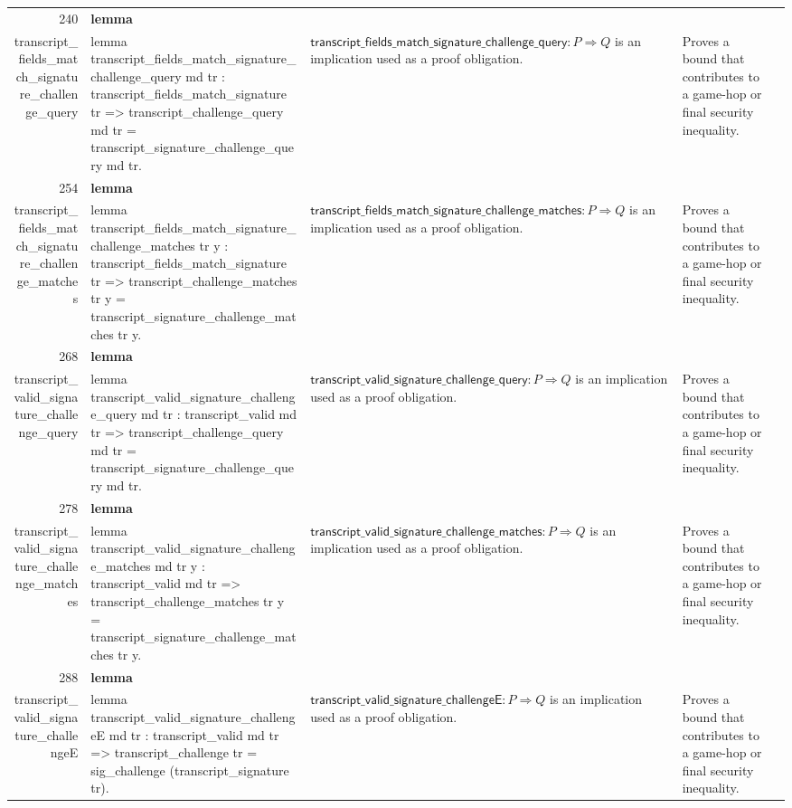 \documentclass[10pt]{article}
\newcommand{\ec}[1]{\begingroup\ttfamily\scriptsize #1\endgroup}
\begin{document}
\begin{longtable}{r L{0.17\textwidth} L{0.26\textwidth} L{0.27\textwidth} L{0.20\textwidth}}
240 & \textbf{lemma}\\\ec{transcript\_fields\_match\_signature\_challenge\_query} & \ec{lemma transcript\_fields\_match\_signature\_challenge\_query md tr : transcript\_fields\_match\_signature tr => transcript\_challenge\_query md tr = transcript\_signature\_challenge\_query md tr.} & \(\mathsf{transcript\_fields\_match\_signature\_challenge\_query} : P \Rightarrow Q\) is an implication used as a proof obligation. & Proves a bound that contributes to a game-hop or final security inequality. \\
254 & \textbf{lemma}\\\ec{transcript\_fields\_match\_signature\_challenge\_matches} & \ec{lemma transcript\_fields\_match\_signature\_challenge\_matches tr y : transcript\_fields\_match\_signature tr => transcript\_challenge\_matches tr y = transcript\_signature\_challenge\_matches tr y.} & \(\mathsf{transcript\_fields\_match\_signature\_challenge\_matches} : P \Rightarrow Q\) is an implication used as a proof obligation. & Proves a bound that contributes to a game-hop or final security inequality. \\
268 & \textbf{lemma}\\\ec{transcript\_valid\_signature\_challenge\_query} & \ec{lemma transcript\_valid\_signature\_challenge\_query md tr : transcript\_valid md tr => transcript\_challenge\_query md tr = transcript\_signature\_challenge\_query md tr.} & \(\mathsf{transcript\_valid\_signature\_challenge\_query} : P \Rightarrow Q\) is an implication used as a proof obligation. & Proves a bound that contributes to a game-hop or final security inequality. \\
278 & \textbf{lemma}\\\ec{transcript\_valid\_signature\_challenge\_matches} & \ec{lemma transcript\_valid\_signature\_challenge\_matches md tr y : transcript\_valid md tr => transcript\_challenge\_matches tr y = transcript\_signature\_challenge\_matches tr y.} & \(\mathsf{transcript\_valid\_signature\_challenge\_matches} : P \Rightarrow Q\) is an implication used as a proof obligation. & Proves a bound that contributes to a game-hop or final security inequality. \\
288 & \textbf{lemma}\\\ec{transcript\_valid\_signature\_challengeE} & \ec{lemma transcript\_valid\_signature\_challengeE md tr : transcript\_valid md tr => transcript\_challenge tr = sig\_challenge (transcript\_signature tr).} & \(\mathsf{transcript\_valid\_signature\_challengeE} : P \Rightarrow Q\) is an implication used as a proof obligation. & Proves a bound that contributes to a game-hop or final security inequality. \\

\end{longtable}
\end{document}
